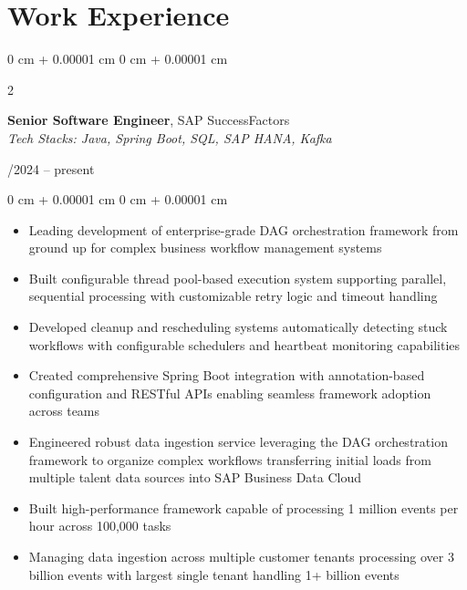 \documentclass[10pt, letterpaper]{article}
\newenvironment{highlights}{
    \begin{itemize}[
        topsep=0.10 cm,
        parsep=0.10 cm,
        partopsep=0pt,
        itemsep=0pt,
        leftmargin=0 cm + 10pt
    ]
}{
    \end{itemize}
}
\newenvironment{onecolentry}{
    \begin{adjustwidth}{
        0 cm + 0.00001 cm
    }{
        0 cm + 0.00001 cm
    }
}{
    \end{adjustwidth}
}
\newenvironment{twocolentry}[2][]{
    \onecolentry
    \def\secondColumn{#2}
    \setcolumnwidth{\fill, 4.5 cm}
    \begin{paracol}{2}
}{
    \switchcolumn \raggedleft \secondColumn
    \end{paracol}
    \endonecolentry
}
\begin{document}
    \section{Work Experience}

    \begin{twocolentry}{11/2024 -- present}
        \textbf{Senior Software Engineer}, SAP SuccessFactors\\
        \textit{Tech Stacks: Java, Spring Boot, SQL, SAP HANA, Kafka}
    \end{twocolentry}
    \vspace{0.15cm}
    \begin{onecolentry}
        \begin{highlights}
            \item Leading development of enterprise-grade DAG orchestration framework from ground up for complex business workflow management systems
            \item Built configurable thread pool-based execution system supporting parallel, sequential processing with customizable retry logic and timeout handling
            \item Developed cleanup and rescheduling systems automatically detecting stuck workflows with configurable schedulers and heartbeat monitoring capabilities
            \item Created comprehensive Spring Boot integration with annotation-based configuration and RESTful APIs enabling seamless framework adoption across teams
            \item Engineered robust data ingestion service leveraging the DAG orchestration framework to organize complex workflows transferring initial loads from multiple talent data sources into SAP Business Data Cloud
            \item Built high-performance framework capable of processing 1 million events per hour across 100,000 tasks
            \item Managing data ingestion across multiple customer tenants processing over 3 billion events with largest single tenant handling 1+ billion events
        \end{highlights}
    \end{onecolentry}
    \vspace{0.3cm}
\end{document}
